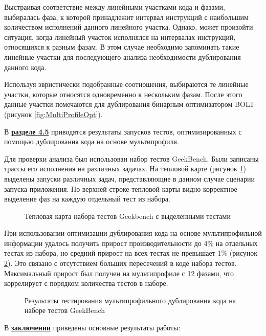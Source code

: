 Выстраивая соответствие между линейными участками кода и фазами, выбиралась фаза, к которой принадлежит интервал инструкций с наибольшим количеством исполнений данного линейного участка. Однако, может произойти ситуация, когда линейный участок исполнялся на интервалах инструкций, относящихся к разным фазам. В этом случае необходимо запоминать такие линейные участки для последующего анализа необходимости дублирования данного кода.

Используя эвристически подобранные соотношения, выбираются те линейные участки, которые относятся одновременно к нескольким фазам. После этого данные участки помечаются для дублирования бинарным оптимизатором BOLT (рисунок \cref{fig:MultiProfileOpt}).

В \underline{\textbf{разделе 4.5}} приводятся результаты запусков тестов, оптимизированных с помощью дублирования кода на основе мультипрофиля.

Для проверки анализа был использован набор тестов GeekBench. Были записаны трассы его исполнения на различных задачах. На тепловой карте (рисунок \cref{fig:HeatmapGKB}) выделены запуски различных задач, представляющие в данном случае сценарии запуска приложения. По верхней строке тепловой карты видно корректное выделение фаз на каждую отдельный тест из набора.

\begin{figure}[!h]
    \centerfloat{
        \texttt{[image: \_16]}
    }
    \caption{Тепловая карта набора тестов Geekbench с выделенными тестами}\label{fig:HeatmapGKB}
\end{figure}

При использовании оптимизации дублирования кода на основе мультипрофильной информации удалось получить прирост производительности до 4\% на отдельных тестах из набора, но средний прирост на всех тестах не превышает 1\% (рисунок \cref{fig:ResGKB}). Это связано с отсутствием больших пересечений в коде набора тестов. Максимальный прирост был получен на мультипрофиле с 12 фазами, что коррелирует с порядком количества тестов в наборе.

\begin{figure}[!h]
    \caption{Результаты тестирования мультипрофильного дублирования кода на наборе тестов GeekBench}\label{fig:ResGKB}
\end{figure}

\FloatBarrier
{}                                  %
В \underline{\textbf{заключении}} приведены основные результаты работы:


